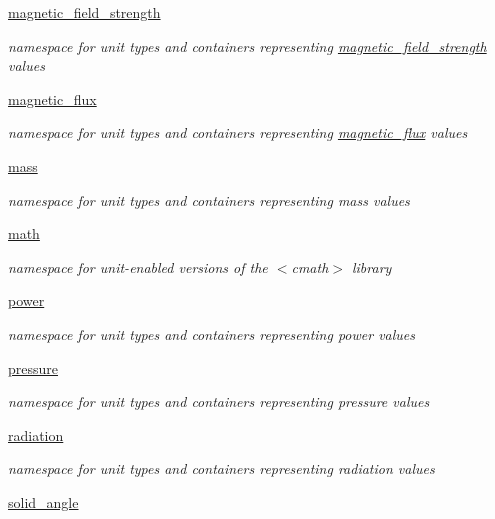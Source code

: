 \begin{DoxyCompactItemize}
 \hyperlink{namespaceunits_1_1magnetic__field__strength}{magnetic\+\_\+field\+\_\+strength}
\begin{DoxyCompactList}\small\item\em namespace for unit types and containers representing \hyperlink{namespaceunits_1_1magnetic__field__strength}{magnetic\+\_\+field\+\_\+strength} values \end{DoxyCompactList}\item 
 \hyperlink{namespaceunits_1_1magnetic__flux}{magnetic\+\_\+flux}
\begin{DoxyCompactList}\small\item\em namespace for unit types and containers representing \hyperlink{namespaceunits_1_1magnetic__flux}{magnetic\+\_\+flux} values \end{DoxyCompactList}\item 
 \hyperlink{namespaceunits_1_1mass}{mass}
\begin{DoxyCompactList}\small\item\em namespace for unit types and containers representing mass values \end{DoxyCompactList}\item 
 \hyperlink{namespaceunits_1_1math}{math}
\begin{DoxyCompactList}\small\item\em namespace for unit-\/enabled versions of the {\ttfamily $<$cmath$>$} library \end{DoxyCompactList}\item 
 \hyperlink{namespaceunits_1_1power}{power}
\begin{DoxyCompactList}\small\item\em namespace for unit types and containers representing power values \end{DoxyCompactList}\item 
 \hyperlink{namespaceunits_1_1pressure}{pressure}
\begin{DoxyCompactList}\small\item\em namespace for unit types and containers representing pressure values \end{DoxyCompactList}\item 
 \hyperlink{namespaceunits_1_1radiation}{radiation}
\begin{DoxyCompactList}\small\item\em namespace for unit types and containers representing radiation values \end{DoxyCompactList}\item 
 \hyperlink{namespaceunits_1_1solid__angle}{solid\+\_\+angle}

\end{DoxyCompactItemize}
